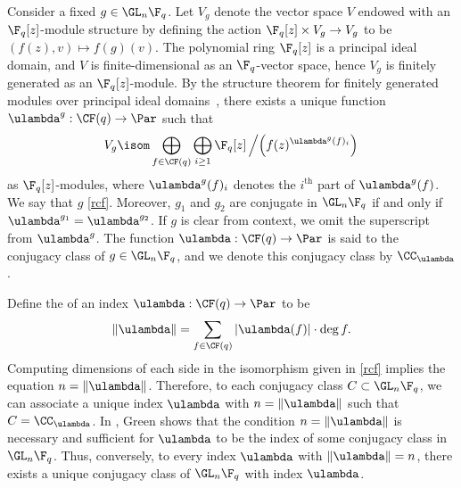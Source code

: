 Consider a fixed $g \in \GL_n \F_q$.
Let \(V_g\) denote the vector space $V$ endowed with an $\F_q [z]$-module structure by defining the action $\F_q [z] \times V_g \to V_g$ to be $(f(z), v) \mapsto f(g)(v)$.
The polynomial ring $\F_q[z]$ is a principal ideal domain, and $V$ is finite-dimensional as an $\F_q$-vector space, hence $V_g$ is finitely generated as an $\F_q[z]$-module.
By the structure theorem for finitely generated modules over principal ideal domains~\cite[Theorem~12.1.6]{DF}, there exists a unique function $\ulambda^g : \CF (q) \to \Par$ such that
\begin{equation} \label{rcf}
V_g \isom \bigoplus_{f \in \CF (q)} \bigoplus_{i \geq 1} \F_q [z] \left / \left ( f(z)^{\ulambda^g (f)_i} \right ) \right .
\end{equation}
as $\F_q [z]$-modules,
where $\ulambda^g (f)_i$ denotes the $i^\text{th}$ part of $\ulambda ^g (f)$.
We say that \(g\)  \eqref{rcf}.
Moreover, \(g_1\) and \(g_2\) are conjugate in \(\GL_n \F_q\) if and only if \(\ulambda^{g_1} = \ulambda^{g_2}\).
If \(g\) is clear from context, we omit the superscript from \(\ulambda^g\).
The function $\ulambda : \CF (q) \to \Par$ is said to  the conjugacy class of $g \in \GL_n \F_q$,
and we denote this conjugacy class by \(\CC_\ulambda\).

Define the  of an index \(\ulambda : \CF (q) \to \Par\) to be
\begin{equation}
\| \ulambda \| = \sum_{f \in \CF (q)} |\ulambda (f)| \cdot \deg f.
\end{equation}
Computing dimensions of each side in the isomorphism given in \eqref{rcf} implies the equation $n = \| \ulambda \|$.
Therefore, to each conjugacy class $C \subset \GL_n \F_q$, we can associate a unique index $\ulambda$ with $n = \| \ulambda \|$ such that \(C = \CC_\ulambda\).
In \cite{green}, Green shows that the condition $n = \| \ulambda \|$ is necessary and sufficient for $\ulambda$ to be the index of some conjugacy class in $\GL_n \F_q$.
Thus, conversely, to every index $\ulambda$ with $\| \ulambda \| = n$, there exists a unique conjugacy class of $\GL_n \F_q$ with index $\ulambda$.


